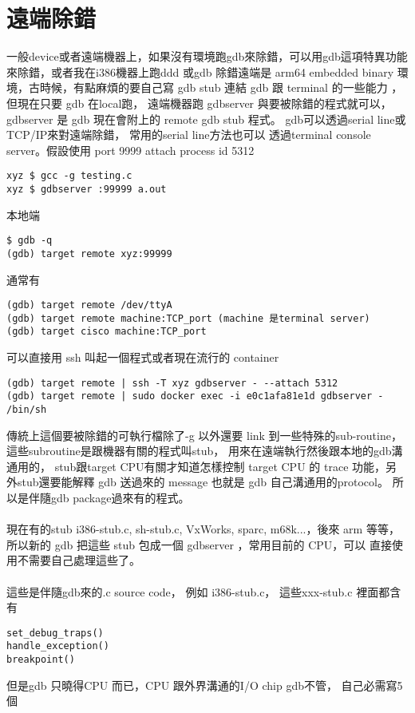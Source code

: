   \section{遠端除錯}
    一般device或者遠端機器上，如果沒有環境跑gdb來除錯，可以用gdb這項特異功能
    來除錯，或者我在i386機器上跑ddd 或gdb 除錯遠端是 arm64 embedded binary 
    環境，古時候，有點麻煩的要自己寫 gdb stub 連結 gdb 跟 terminal 的一些能力
    ，但現在只要 gdb 在local跑， 遠端機器跑 gdbserver 與要被除錯的程式就可以，
    gdbserver 是 gdb 現在會附上的 remote gdb stub 程式。
    gdb可以透過serial line或TCP/IP來對遠端除錯， 常用的serial line方法也可以
    透過terminal console server。假設使用 port 9999 attach process id 5312
    \begin{verbatim}
xyz $ gcc -g testing.c
xyz $ gdbserver :99999 a.out
    \end{verbatim}
    本地端
    \begin{verbatim}
$ gdb -q
(gdb) target remote xyz:99999
    \end{verbatim}
    通常有
    \begin{verbatim}
(gdb) target remote /dev/ttyA
(gdb) target remote machine:TCP_port (machine 是terminal server)
(gdb) target cisco machine:TCP_port
    \end{verbatim}
    可以直接用 ssh 叫起一個程式或者現在流行的 container
    \begin{verbatim}
(gdb) target remote | ssh -T xyz gdbserver - --attach 5312
(gdb) target remote | sudo docker exec -i e0c1afa81e1d gdbserver - /bin/sh
    \end{verbatim}
    傳統上這個要被除錯的可執行檔除了-g 以外還要 link 到一些特殊的sub-routine，
    這些subroutine是跟機器有關的程式叫stub， 用來在遠端執行然後跟本地的gdb溝
    通用的， stub跟target CPU有關才知道怎樣控制 target CPU 的 trace 功能，另
    外stub還要能解釋 gdb 送過來的 message 也就是 gdb 自己溝通用的protocol。
    所以是伴隨gdb package過來有的程式。
    \\\\
    現在有的stub i386-stub.c, sh-stub.c, VxWorks, sparc, m68k...，後來 arm
    等等，所以新的 gdb 把這些 stub 包成一個 gdbserver ，常用目前的 CPU，可以
    直接使用不需要自己處理這些了。
    \\\\
    這些是伴隨gdb來的.c source code， 例如 i386-stub.c， 這些xxx-stub.c
    裡面都含有
    \begin{verbatim}
set_debug_traps()
handle_exception()
breakpoint()
    \end{verbatim}
    但是gdb 只曉得CPU 而已，CPU 跟外界溝通的I/O chip gdb不管， 自己必需寫5個
